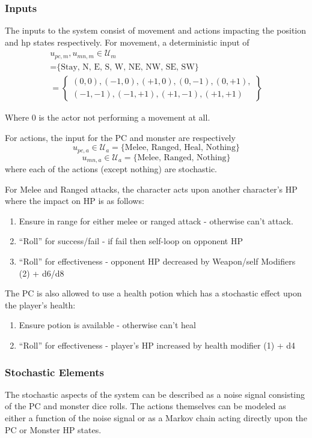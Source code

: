 \documentclass[letterpaper, 10 pt, conference]{ieeeconf}
\begin{document}
\subsubsection{Inputs}
The inputs to the system consist of movement and actions impacting the position and hp states respectively.
For movement, a deterministic input of 
\begin{multline*}
    u_{pc,m}, u_{mn,m} \in \mathcal{U}_{m} \\
    = \text{\{Stay, N, E, S, W, NE, NW, SE, SW\}}\\
    = \left\{
        \begin{multlined}
        (0,0),(-1,0), (+1,0),(0,-1), (0,+1),\\
        (-1,-1), (-1,+1), (+1,-1),(+1,+1)
    \end{multlined}\right\}
\end{multline*}

Where \(0\) is the actor not performing a movement at all.

For actions, the input for the PC and monster are respectively \[
    u_{pc,a} \in \mathcal{U}_{a} = \{\text{Melee, Ranged, Heal, Nothing}\}\]
    \[u_{mn,a} \in \mathcal{U}_{a} = \{\text{Melee, Ranged, Nothing}\}
\] where each of the actions (except nothing) are stochastic.

For Melee and Ranged attacks, the character acts upon another character's HP where the impact on HP is as follows:
\begin{enumerate}
    \item Ensure in range for either melee or ranged attack - otherwise can't attack.
    \item ``Roll'' for success/fail - if fail then self-loop on opponent HP
    \item ``Roll'' for effectiveness - opponent HP decreased by Weapon/self Modifiers (2) + d6/d8
\end{enumerate}

The PC is also allowed to use a health potion which has a stochastic effect upon the player's health:
\begin{enumerate}
    \item Ensure potion is available - otherwise can't heal
    \item ``Roll'' for effectiveness - player's HP increased by health modifier (1) + d4
\end{enumerate}

\subsubsection{Stochastic Elements}
The stochastic aspects of the system can be described as a noise signal consisting of the PC and monster dice rolls.
The actions themselves can be modeled as either a function of the noise signal or as a Markov chain acting directly upon the PC or Monster HP states.
\end{document}
